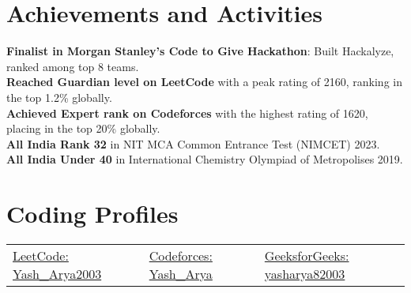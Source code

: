 \documentclass[letterpaper,11pt]{article}
\begin{document}
\section{Achievements and Activities}
\textbullet{}\textbf{ Finalist in Morgan Stanley's Code to Give Hackathon}: Built Hackalyze, ranked among top 8 teams.\\
    \textbullet{} \textbf{Reached Guardian level on LeetCode }with a peak rating of 2160, ranking in the top 1.2\% globally.\\ 
\vspace{3pt}
\textbullet{} \textbf{Achieved Expert rank on Codeforces }with the highest rating of 1620, placing in the top 20\% globally.\\
\vspace{3pt}
\textbullet{} \textbf{All India Rank 32} in NIT MCA Common Entrance Test (NIMCET) 2023.\\
\vspace{3pt}
\textbullet{}  \textbf{All India Under 40} in International Chemistry Olympiad of Metropolises 2019.
\vspace{-5pt}
\sectionsep


\section{Coding Profiles}
\vspace{-2pt} 
\begin{center}
\begin{tabularx}{\textwidth}{X X X}
\href{https://leetcode.com/Yash_Arya2003/}{LeetCode: Yash\_Arya2003} &
\href{https://codeforces.com/profile/Yash_Arya}{Codeforces: Yash\_Arya} &
\href{https://www.geeksforgeeks.org/user/yasharya82003/}{GeeksforGeeks: yasharya82003} \\
\end{tabularx}
\end{center}
\vspace{-7pt}
\end{document}
